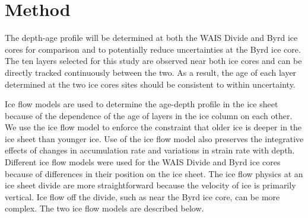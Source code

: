 \documentclass[12pt]{article}
\begin{document}





\section{Method}\label{method}
The depth-age profile will be determined at both the WAIS Divide and Byrd ice cores for comparison and to potentially reduce uncertainties at the Byrd ice core. The ten layers selected for this study are observed near both ice cores and can be directly tracked continuously between the two. As a result, the age of each layer determined at the two ice cores sites should be consistent to within uncertainty.

Ice flow models are used to determine the age-depth profile in the ice sheet because of the dependence of the age of layers in the ice column on each other. We use the ice flow model to enforce the constraint that older ice is deeper in the ice sheet than younger ice. Use of the ice flow model also preserves the integrative effects of changes in accumulation rate and variations in strain rate with depth. Different ice flow models were used for the WAIS Divide and Byrd ice cores because of differences in their position on the ice sheet. The ice flow physics at an ice sheet divide are more straightforward because the velocity of ice is primarily vertical. Ice flow off the divide, such as near the Byrd ice core, can be more complex. The two ice flow models are described below.
\end{document}
